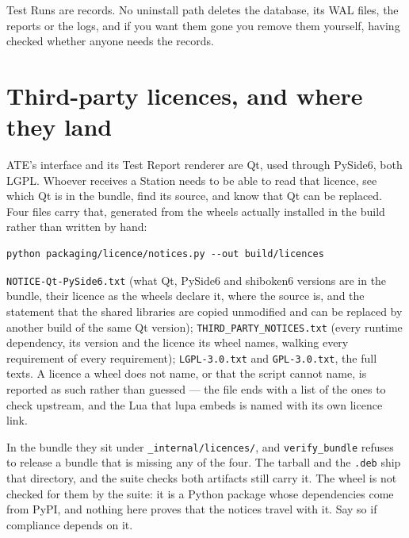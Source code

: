 Test Runs are records. No uninstall path deletes the database, its WAL files, the reports or the
logs, and if you want them gone you remove them yourself, having checked whether anyone needs the
records.

\section{Third-party licences, and where they land}

ATE's interface and its Test Report renderer are Qt, used through PySide6, both LGPL. Whoever
receives a Station needs to be able to read that licence, see which Qt is in the bundle, find its
source, and know that Qt can be replaced. Four files carry that, generated from the wheels actually
installed in the build rather than written by hand:

\begin{lstlisting}[language=ATEShell]
python packaging/licence/notices.py --out build/licences
\end{lstlisting}

\texttt{NOTICE-Qt-PySide6.txt} (what Qt, PySide6 and shiboken6 versions are in the bundle, their
licence as the wheels declare it, where the source is, and the statement that the shared libraries
are copied unmodified and can be replaced by another build of the same Qt version);
\texttt{THIRD\_PARTY\_NOTICES.txt} (every runtime dependency, its version and the licence its wheel
names, walking every requirement of every requirement); \texttt{LGPL-3.0.txt} and
\texttt{GPL-3.0.txt}, the full texts. A licence a wheel does not name, or that the script cannot
name, is reported as such rather than guessed --- the file ends with a list of the ones to check
upstream, and the Lua that lupa embeds is named with its own licence link.

In the bundle they sit under \texttt{\_internal/licences/}, and \texttt{verify\_bundle} refuses to
release a bundle that is missing any of the four. The tarball and the \texttt{.deb} ship that
directory, and the suite checks both artifacts still carry it. The wheel is not checked for them by
the suite: it is a Python package whose dependencies come from PyPI, and nothing here proves that
the notices travel with it. Say so if compliance depends on it.

